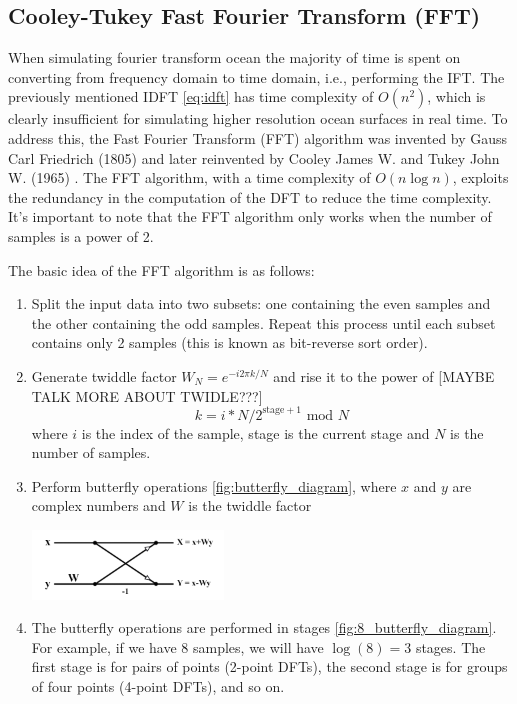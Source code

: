 \subsection{Cooley-Tukey Fast Fourier Transform (FFT)}
When simulating fourier transform ocean the majority of time is spent on converting from frequency domain to time domain, i.e., performing the IFT.
The previously mentioned IDFT \ref{eq:idft} has time complexity of $O(n^2)$, which is clearly insufficient for simulating higher resolution ocean surfaces in real time.
To address this, the Fast Fourier Transform (FFT) algorithm was invented by Gauss Carl Friedrich (1805) \cite{gauss1866} and later reinvented by Cooley James W. and Tukey John W. (1965) \cite{cooley1965}. 
The FFT algorithm, with a time complexity of $O(n\log n)$, exploits the redundancy in the computation of the DFT to reduce the time complexity. It's important to note that the FFT algorithm only works when the number of samples is a power of 2.

The basic idea of the FFT algorithm is as follows:
\begin{enumerate}
    \item Split the input data into two subsets: one containing the even samples and the other containing the odd samples. Repeat this process until each subset contains only 2 samples (this is known as bit-reverse sort order).
    \item Generate twiddle factor $W_N = e^{-i 2 \pi k / N}$ and rise it to the power of [MAYBE TALK MORE ABOUT TWIDLE???]\\
    \begin{equation}
        k = i * N / 2^{\text{stage} + 1} \text{ mod } N
    \end{equation}
    where $i$ is the index of the sample, stage is the current stage and $N$ is the number of samples.
    \item Perform butterfly operations \ref{fig:butterfly_diagram}, where $x$ and $y$ are complex numbers and $W$ is the twiddle factor

    \begin{minipage}{1\textwidth}
        \centering
        \includegraphics[width=0.4\textwidth]{"images/butterfly_diagram.png"}
        \label{fig:butterfly_diagram}
    \end{minipage}

    \item The butterfly operations are performed in stages \ref{fig:8_butterfly_diagram}. For example, if we have 8 samples, we will have $\log(8) = 3 $ stages. The first stage is for pairs of points (2-point DFTs), the second stage is for groups of four points (4-point DFTs), and so on.
\end{enumerate}

